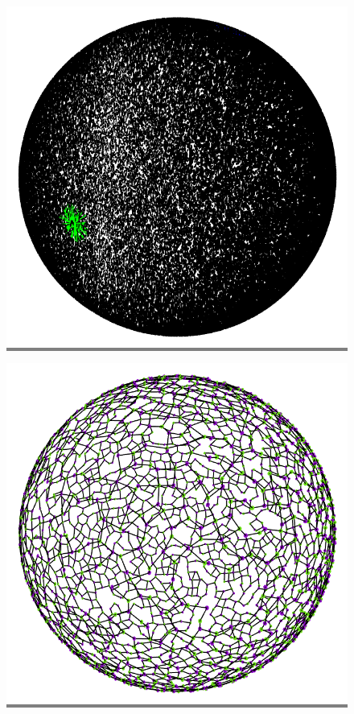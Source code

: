 \documentclass{article}
\begin{document}
\begin{figure}
\begin{minipage}{0.3\textwidth}
    \end{minipage}
    \vskip 0.1in
    \begin{minipage}{0.3\textwidth}
    \colorbox{gray}{\includegraphics[width=\linewidth]{./images/sphere_2.png}}
    \end{minipage}
    \hspace{\fill}
    \begin{minipage}{0.3\textwidth}
    \colorbox{gray}{\includegraphics[width=\linewidth]{./images/sphere_2_bb_0.png}}

\end{minipage}
\end{figure}
\end{document}
